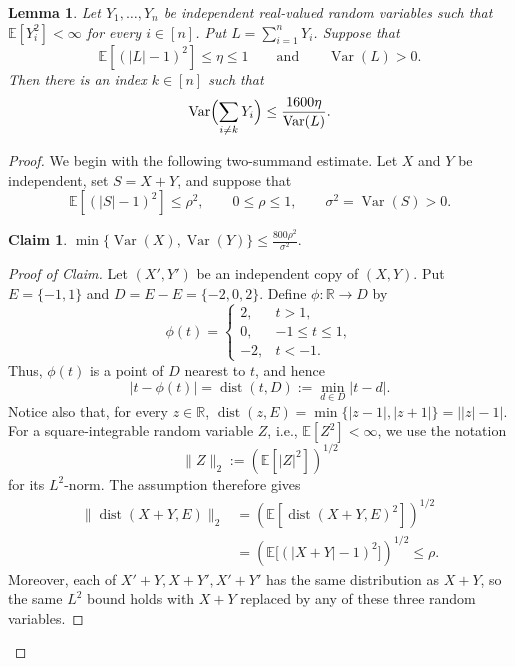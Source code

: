 \documentclass[11pt]{article}
\numberwithin{equation}{section}
\newtheorem{lemma}[theorem]{Lemma}
\newtheorem{claim}{Claim}
\theoremstyle{definition}
\theoremstyle{remark}
\begin{document}
\begin{lemma}\label{lem:one-large-summand}
Let $Y_1,\ldots,Y_n$ be independent  real-valued random
variables  such
that
$
 \mathbb E[Y_i^2]<\infty$ for every $i\in[n]$.
Put $L=\sum_{i=1}^nY_i$.  Suppose that
$$
 \mathbb E[(|L|-1)^2]\leq \eta\leq 1
 \qquad\text{and}\qquad
 \operatorname{Var}(L)>0.
$$
Then there is an index $k\in[n]$ such that
$$
 \operatorname{Var}\Bigl(\sum_{i\neq k}Y_i\Bigr)
 \leq \frac{1600\eta}{\operatorname{Var}(L)}.
$$
\end{lemma}
\begin{proof}\setcounter{claim}{0}
We begin with the following two-summand estimate.  Let $X$ and $Y$ be
independent, set $S=X+Y$, and suppose that
$$
 \mathbb E[(|S|-1)^2]\leq \rho^2,\qquad
 0\leq\rho\leq1,\qquad
 \sigma^2=\operatorname{Var}(S)>0.
$$
\begin{claim}\label{cl1}
$
\min\{\operatorname{Var}(X),\operatorname{Var}(Y)\}
 \leq \frac{800\rho^2}{\sigma^2}.
$
\end{claim}
\begin{proof}[Proof of Claim]
Let $(X',Y')$ be an independent copy of $(X,Y)$. Put
$
E=\{-1,1\}
$
and
$
D=E-E=\{-2,0,2\}.
$
Define $\phi:\mathbb R\to D$ by
$$
\phi(t)=
\begin{cases}
 2,  & t>1,\\
 0,  & -1\leq t\leq1,\\
 -2, & t<-1.
\end{cases}
$$
Thus, $\phi(t)$ is a point of $D$ nearest to $t$, and hence
$$
|t-\phi(t)|=\operatorname{dist}(t,D)
:=\min_{d\in D}|t-d|.
$$
Notice also that, for every $z\in\mathbb R$,
$
\operatorname{dist}(z,E)
=\min\{|z-1|,|z+1|\}
=\bigl||z|-1\bigr|.
$
For a square-integrable random variable $Z$, i.e., $
 \mathbb E[Z^2]<\infty$, we use the notation
$$
\|Z\|_2:=\left(\mathbb E[|Z|^2]\right)^{1/2}
$$
for its $L^2$-norm. The assumption therefore gives
$$
\begin{aligned}
\bigl\|\operatorname{dist}(X+Y,E)\bigr\|_2
&=\left(
\mathbb E\left[
\operatorname{dist}(X+Y,E)^2
\right]\right)^{1/2}\\
&=\left(
\mathbb E\bigl[(|X+Y|-1)^2\bigr]
\right)^{1/2}\leq\rho.
\end{aligned}
$$
Moreover, each of
$
X'+Y, X+Y', X'+Y'
$
has the same distribution as $X+Y$, so the same $L^2$ bound holds
with $X+Y$ replaced by any of these three random variables.


\end{proof}
\end{proof}
\end{document}
